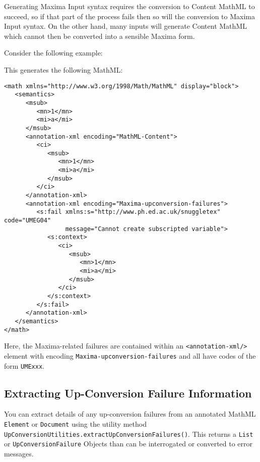 Generating Maxima Input syntax requires the conversion to Content MathML to
succeed, so if that part of the process fails then so will the conversion to
Maxima Input syntax. On the other hand, many inputs will generate Content MathML
which cannot then be converted into a sensible Maxima form.

Consider the following example:


This generates the following MathML:

\begin{verbatim}
<math xmlns="http://www.w3.org/1998/Math/MathML" display="block">
   <semantics>
      <msub>
         <mn>1</mn>
         <mi>a</mi>
      </msub>
      <annotation-xml encoding="MathML-Content">
         <ci>
            <msub>
               <mn>1</mn>
               <mi>a</mi>
            </msub>
         </ci>
      </annotation-xml>
      <annotation-xml encoding="Maxima-upconversion-failures">
         <s:fail xmlns:s="http://www.ph.ed.ac.uk/snuggletex" code="UMEG04"
                 message="Cannot create subscripted variable">
            <s:context>
               <ci>
                  <msub>
                     <mn>1</mn>
                     <mi>a</mi>
                  </msub>
               </ci>
            </s:context>
         </s:fail>
      </annotation-xml>
   </semantics>
</math>
\end{verbatim}

Here, the Maxima-related failures are contained within an
\verb|<annotation-xml/>| element with encoding \verb|Maxima-upconversion-failures|
and all have codes of the form \verb|UMExxx|.

\subsection*{Extracting Up-Conversion Failure Information}

You can extract details of any up-conversion failures from an annotated MathML
\verb|Element| or \verb|Document| using the utility method
\verb|UpConversionUtilities.extractUpConversionFailures()|. This returns
a \verb|List| or \verb|UpConversionFailure| Objects than can be interrogated or
converted to error messages.
